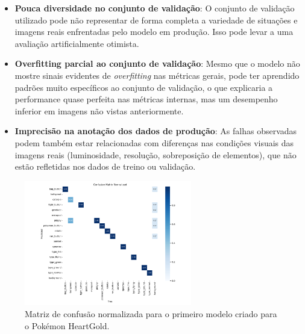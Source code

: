 \begin{itemize}
    \item \textbf{Pouca diversidade no  conjunto de validação}: O conjunto de validação utilizado pode não representar de forma completa a variedade de situações e imagens reais enfrentadas pelo modelo em produção. Isso pode levar a uma avaliação artificialmente otimista.
    
    \item \textbf{Overfitting parcial ao conjunto de validação}: Mesmo que o modelo não mostre sinais evidentes de \textit{overfitting} nas métricas gerais, pode ter aprendido padrões muito específicos ao conjunto de validação, o que explicaria a performance quase perfeita nas métricas internas, mas um desempenho inferior em imagens não vistas anteriormente.
    
    \item \textbf{Imprecisão na anotação dos dados de produção}: As falhas observadas podem também estar relacionadas com diferenças nas condições visuais das imagens reais (luminosidade, resolução, sobreposição de elementos), que não estão refletidas nos dados de treino ou validação.
\end{itemize}

\begin{figure}[!h]
    \centering
    \includegraphics[width=0.65\textwidth]{imagens/confusion_matrix_normalized_primeiro_modelo.png}
    \caption{Matriz de confusão normalizada para o primeiro modelo criado para o Pokémon HeartGold.}
    \label{fig:confusion_matrix_primeiro_modelo}
\end{figure}

